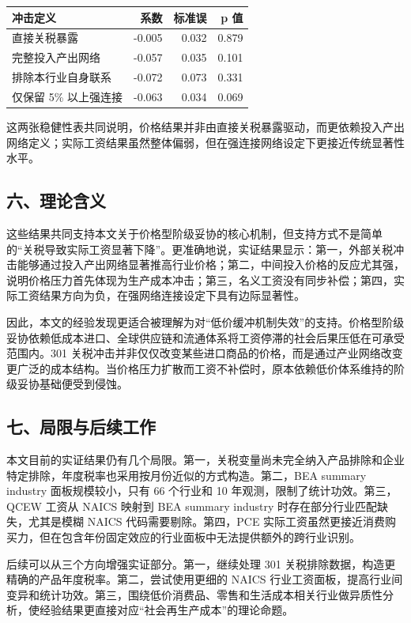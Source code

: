 \documentclass[
]{ctexart}
\newcounter{none} %
\begin{document}
{\def\LTcaptype{none} %
\begin{longtable}[]{@{}lrrr@{}}
\toprule\noalign{}
冲击定义 & 系数 & 标准误 & p 值 \\
\midrule\noalign{}
\endhead
\bottomrule\noalign{}
\endlastfoot
直接关税暴露 & -0.005 & 0.032 & 0.879 \\
完整投入产出网络 & -0.057 & 0.035 & 0.101 \\
排除本行业自身联系 & -0.072 & 0.073 & 0.331 \\
仅保留 5\% 以上强连接 & -0.063 & 0.034 & 0.069 \\
\end{longtable}
}

这两张稳健性表共同说明，价格结果并非由直接关税暴露驱动，而更依赖投入产出网络定义；实际工资结果虽然整体偏弱，但在强连接网络设定下更接近传统显著性水平。

\subsection{六、理论含义}\label{ux516dux7406ux8bbaux542bux4e49}

这些结果共同支持本文关于价格型阶级妥协的核心机制，但支持方式不是简单的``关税导致实际工资显著下降''。更准确地说，实证结果显示：第一，外部关税冲击能够通过投入产出网络显著推高行业价格；第二，中间投入价格的反应尤其强，说明价格压力首先体现为生产成本冲击；第三，名义工资没有同步补偿；第四，实际工资结果方向为负，在强网络连接设定下具有边际显著性。

因此，本文的经验发现更适合被理解为对``低价缓冲机制失效''的支持。价格型阶级妥协依赖低成本进口、全球供应链和流通体系将工资停滞的社会后果压低在可承受范围内。301
关税冲击并非仅仅改变某些进口商品的价格，而是通过产业网络改变更广泛的成本结构。当价格压力扩散而工资不补偿时，原本依赖低价体系维持的阶级妥协基础便受到侵蚀。

\subsection{七、局限与后续工作}\label{ux4e03ux5c40ux9650ux4e0eux540eux7eedux5de5ux4f5c}

本文目前的实证结果仍有几个局限。第一，关税变量尚未完全纳入产品排除和企业特定排除，年度税率也采用按月份近似的方式构造。第二，BEA
summary industry 面板规模较小，只有 66 个行业和 10
年观测，限制了统计功效。第三，QCEW 工资从 NAICS 映射到 BEA summary
industry 时存在部分行业匹配缺失，尤其是模糊 NAICS
代码需要剔除。第四，PCE
实际工资虽然更接近消费购买力，但在包含年份固定效应的行业面板中无法提供额外的跨行业识别。

后续可以从三个方向增强实证部分。第一，继续处理 301
关税排除数据，构造更精确的产品年度税率。第二，尝试使用更细的 NAICS
行业工资面板，提高行业间变异和统计功效。第三，围绕低价消费品、零售和生活成本相关行业做异质性分析，使经验结果更直接对应``社会再生产成本''的理论命题。
\end{document}
